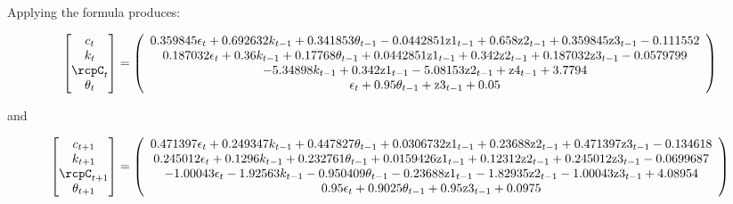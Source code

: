\documentclass[12pt]{article}
\begin{document}
Applying the formula  produces:

{\tiny
\begin{gather}
  \begin{bmatrix}
c_t\\k_t\\ \rcpC_t\\\theta_t
  \end{bmatrix}=%
   \left(
   \begin{array}{c}
 0.359845 \epsilon _t+0.692632 k_{t-1}+0.341853 \theta _{t-1}-0.0442851
   \text{z1}_{t-1}+0.658 \text{z2}_{t-1}+0.359845 \text{z3}_{t-1}-0.111552 \\
 0.187032 \epsilon _t+0.36 k_{t-1}+0.17768 \theta _{t-1}+0.0442851
   \text{z1}_{t-1}+0.342 \text{z2}_{t-1}+0.187032 \text{z3}_{t-1}-0.0579799 \\
 -5.34898 k_{t-1}+0.342 \text{z1}_{t-1}-5.08153
   \text{z2}_{t-1}+\text{z4}_{t-1}+3.7794 \\
 \epsilon _t+0.95 \theta _{t-1}+\text{z3}_{t-1}+0.05 \\
   \end{array}
   \right)
\end{gather}
}

and 


{\tiny
\begin{gather}
  \begin{bmatrix}
c_{t+1}\\k_{t+1}\\ \rcpC_{t+1}\\\theta_{t+1}
  \end{bmatrix}=%
  \left(
   \begin{array}{c}
 0.471397 \epsilon _t+0.249347 k_{t-1}+0.447827 \theta _{t-1}+0.0306732
   \text{z1}_{t-1}+0.23688 \text{z2}_{t-1}+0.471397 \text{z3}_{t-1}-0.134618 \\
 0.245012 \epsilon_t+0.1296 k_{t-1}+0.232761 \theta _{t-1}+0.0159426
   \text{z1}_{t-1}+0.12312 \text{z2}_{t-1}+0.245012 \text{z3}_{t-1}-0.0699687 \\
 -1.00043 \epsilon _t-1.92563 k_{t-1}-0.950409 \theta _{t-1}-0.23688
   \text{z1}_{t-1}-1.82935 \text{z2}_{t-1}-1.00043 \text{z3}_{t-1}+4.08954 \\
 0.95 \epsilon _t+0.9025 \theta _{t-1}+0.95 \text{z3}_{t-1}+0.0975 \\
   \end{array}
   \right)
\end{gather}}
\end{document}

